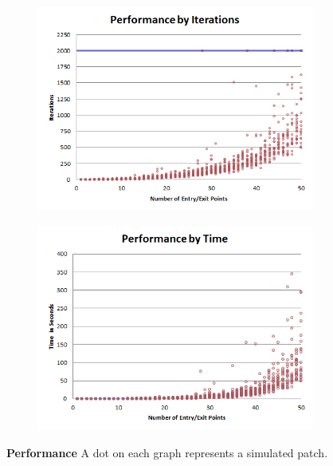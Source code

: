\begin{figure}[t]
 \centering
%
\begin{subfigure}[b]{0.48\linewidth}
 \centering
	\includegraphics[width=\linewidth]{images/res-iter-graph.png}
	\caption{}
 \end{subfigure}
%
\begin{subfigure}[b]{0.48\linewidth}
 \centering
	\includegraphics[width=\linewidth]{images/res-time-graph.png}
	\caption{}
 \end{subfigure}
% 
\caption{
		\textbf{Performance}
		A dot on each graph represents a simulated patch.
}
\end{figure}
